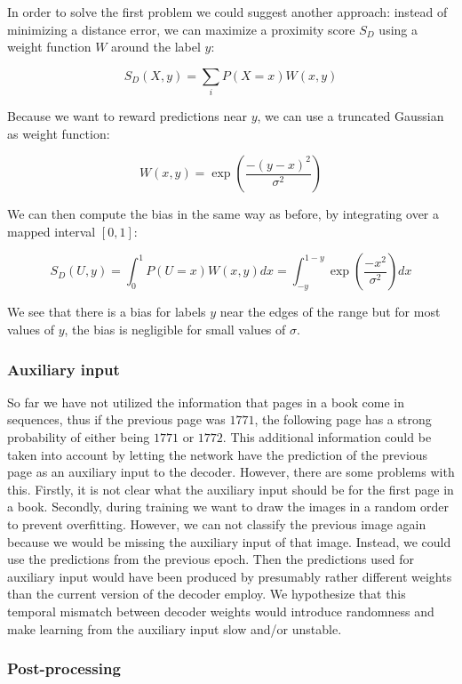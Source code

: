 In order to solve the first problem we could suggest another approach: instead of minimizing a distance error, we can maximize a proximity score $S_D$ using a weight function $W$ around the label $y$:

\[
S_D(X, y) = \sum_i P(X=x) W(x, y)
\]

Because we want to reward predictions near $y$, we can use a truncated Gaussian as weight function:

\[
W(x, y) = \exp \left( \frac{-(y-x)^2}{\sigma^2} \right)
\]

We can then compute the bias in the same way as before, by integrating over a mapped interval $[0,1]$:

\[
S_D(U, y) = \int_0^1 P(U=x) W(x, y) dx =
\int_{-y}^{1-y} \exp \left( \frac{-x^2}{\sigma^2} \right) dx
\]

We see that there is a bias for labels $y$ near the edges of the range but for most values of $y$, the bias is negligible for small values of $\sigma$.

\subsubsection{Auxiliary input}

So far we have not utilized the information that pages in a book come in sequences, thus if the previous page was $1771$, the following page has a strong probability of either being $1771$ or $1772$. This additional information could be taken into account by letting the network have the prediction of the previous page as an auxiliary input to the decoder. However, there are some problems with this. Firstly, it is not clear what the auxiliary input should be for the first page in a book. Secondly, during training we want to draw the images in a random order to prevent overfitting. However, we can not classify the previous image again because we would be missing the auxiliary input of that image. Instead, we could use the predictions from the previous epoch. Then the predictions used for auxiliary input would have been produced by presumably rather different weights than the current version of the decoder employ. We hypothesize that this temporal mismatch between decoder weights would introduce randomness and make learning from the auxiliary input slow and/or unstable.

\subsubsection{Post-processing}

